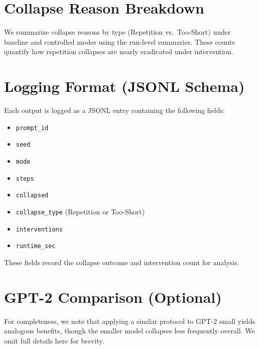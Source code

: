 \documentclass{article}
\begin{document}
\section{Collapse Reason Breakdown}
\label{app:reasons}
We summarize collapse reasons by type (Repetition vs.\ Too-Short) under baseline and controlled modes using the run-level summaries. These counts quantify how repetition collapses are nearly eradicated under intervention.

\section{Logging Format (JSONL Schema)}
Each output is logged as a JSONL entry containing the following fields:
\begin{itemize}
  \item \texttt{prompt\_id}
  \item \texttt{seed}
  \item \texttt{mode}
  \item \texttt{steps}
  \item \texttt{collapsed}
  \item \texttt{collapse\_type} (Repetition or Too-Short)
  \item \texttt{interventions}
  \item \texttt{runtime\_sec}
\end{itemize}
These fields record the collapse outcome and intervention count for analysis.

\section{GPT-2 Comparison (Optional)}
For completeness, we note that applying a similar protocol to GPT-2 small yields analogous benefits, though the smaller model collapses less frequently overall. We omit full details here for brevity.
\end{document}
